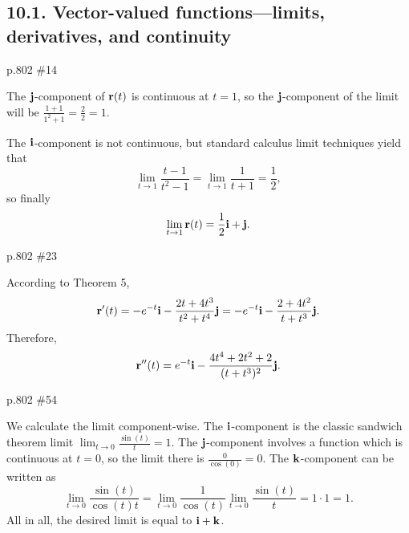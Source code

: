\subsection*{10.1. Vector-valued functions---limits, derivatives, and continuity}
\begin{practice}p.802 \#14\end{practice}
\begin{pracsol}
  The $\mathbf j$-component of $\mathbf r(t)$ is continuous at $t=1$, so the $\mathbf j$-component of the limit will be $\frac{1+1}{1^2+1}=\frac 22=1$.

  The $\mathbf i$-component is not continuous, but standard calculus limit techniques yield that
  \[\lim_{t\to 1}\frac{t-1}{t^2-1}=\lim_{t\to 1}\frac{1}{t+1}=\frac 12,\]
  so finally
  \[\lim_{t\to 1}\mathbf r(t)=\frac12\mathbf i+\mathbf j.\]
\end{pracsol}
\begin{practice}p.802 \#23\end{practice}
\begin{pracsol}
  According to Theorem 5,
  \[\mathbf r'(t)=-e^{-t}\mathbf i-\frac{2t+4t^3}{t^2+t^4}\mathbf j=-e^{-t}\mathbf i-\frac{2+4t^2}{t+t^3}\mathbf j.\]
  Therefore,
  \[\mathbf r''(t)=e^{-t}\mathbf i-\frac{4t^4+2t^2+2}{(t+t^3)^2}\mathbf j.\]
\end{pracsol}
\begin{practice}p.802 \#54\end{practice}
\begin{pracsol}
  We calculate the limit component-wise. The $\mathbf i$-component is the classic sandwich theorem limit $\lim_{t\to 0}\frac{\sin(t)}t=1$. The $\mathbf j$-component involves a function which is continuous at $t=0$, so the limit there is $\frac{0}{\cos(0)}=0$. The $\mathbf k$-component can be written as
  \[\lim_{t\to 0}\frac{\sin(t)}{\cos(t)t}=\lim_{t\to 0}\frac 1{\cos(t)}\lim_{t\to 0}\frac{\sin(t)}{t}=1\cdot 1=1.\]
  All in all, the desired limit is equal to $\mathbf i+\mathbf k$.
\end{pracsol}

